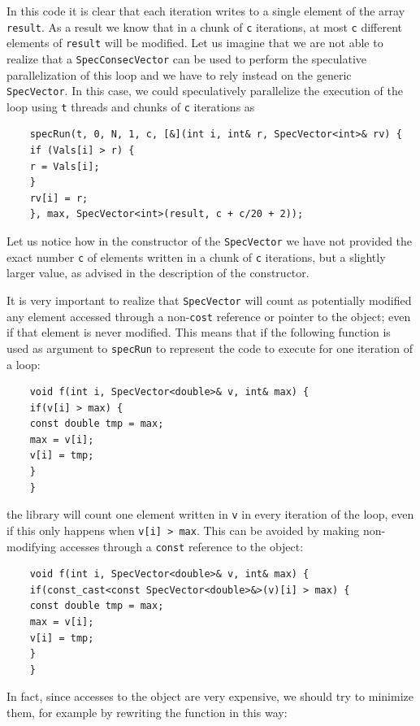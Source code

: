 \documentclass[11pt,a4paper]{article}
\begin{document}
	In this code it is clear that each iteration writes to a single element of the array {\tt result}. As a result we know that in a chunk of {\tt c} iterations, at most {\tt c} different elements of {\tt result} will be modified. Let us imagine that we are not able to realize that a {\tt SpecConsecVector} can be used to perform the speculative parallelization of this loop and we have to rely instead on the generic {\tt SpecVector}. In this case, we could speculatively parallelize the execution of the loop using {\tt t} threads and chunks of {\tt c} iterations as
	
	\begin{verbatim}
	specRun(t, 0, N, 1, c, [&](int i, int& r, SpecVector<int>& rv) {
	if (Vals[i] > r) {
	r = Vals[i];
	}
	rv[i] = r;
	}, max, SpecVector<int>(result, c + c/20 + 2));
	\end{verbatim}
	
	Let us notice how in the constructor of the {\tt SpecVector} we have not provided the exact number {\tt c} of elements written in a chunk of {\tt c} iterations, but a slightly larger value, as advised in the description of the constructor.
	
	It is very important to realize that {\tt SpecVector} will count as potentially modified any element accessed through a non-{\tt cost} reference or pointer to the object; even if that element is never modified. This means that if the following function is used as argument to {\tt specRun} to represent the code to execute for one iteration of a loop:
	
	\begin{verbatim}
	void f(int i, SpecVector<double>& v, int& max) {
	if(v[i] > max) {
	const double tmp = max;
	max = v[i];
	v[i] = tmp;
	}
	}
	\end{verbatim}
	
	\noindent the library will count one element written in {\tt v} in every iteration of the loop, even if this only happens when {\tt v[i] > max}. This can be avoided by making non-modifying accesses through a {\tt const} reference to the object: 
	
	\begin{verbatim}
	void f(int i, SpecVector<double>& v, int& max) {
	if(const_cast<const SpecVector<double>&>(v)[i] > max) {
	const double tmp = max;
	max = v[i];
	v[i] = tmp;
	}
	}
	\end{verbatim}
	
	In fact, since accesses to the object are very expensive, we should try to minimize them, for example by rewriting the function in this way:
	
\end{document}
